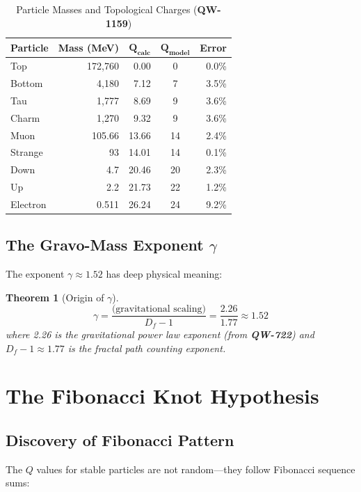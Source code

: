 \documentclass[11pt, a4paper]{article}
\newtheorem{theorem}{Theorem}[section]
\theoremstyle{remark}
\newcommand{\QW}[1]{\textbf{QW-#1}}
\begin{document}
\begin{table}[H]
\centering
\caption{Particle Masses and Topological Charges (\QW{1159})}
\begin{tabular}{|l|r|r|c|r|}
\hline
\textbf{Particle} & \textbf{Mass (MeV)} & $\mathbf{Q_{calc}}$ & $\mathbf{Q_{model}}$ & \textbf{Error} \\
\hline
Top & 172,760 & 0.00 & 0 & 0.0\% \\
Bottom & 4,180 & 7.12 & 7 & 3.5\% \\
Tau & 1,777 & 8.69 & 9 & 3.6\% \\
Charm & 1,270 & 9.32 & 9 & 3.6\% \\
Muon & 105.66 & 13.66 & 14 & 2.4\% \\
Strange & 93 & 14.01 & 14 & 0.1\% \\
Down & 4.7 & 20.46 & 20 & 2.3\% \\
Up & 2.2 & 21.73 & 22 & 1.2\% \\
Electron & 0.511 & 26.24 & 24 & 9.2\% \\
\hline
\end{tabular}
\end{table}

\subsection{The Gravo-Mass Exponent $\gamma$}

The exponent $\gamma \approx 1.52$ has deep physical meaning:

\begin{theorem}[Origin of $\gamma$]
\begin{equation}
\gamma = \frac{\text{(gravitational scaling)}}{D_f - 1} = \frac{2.26}{1.77} \approx 1.52
\end{equation}
where 2.26 is the gravitational power law exponent (from \QW{722}) and $D_f - 1 \approx 1.77$ is the fractal path counting exponent.
\end{theorem}

\section{The Fibonacci Knot Hypothesis}

\subsection{Discovery of Fibonacci Pattern}

The $Q$ values for stable particles are not random—they follow Fibonacci sequence sums:
\end{document}
